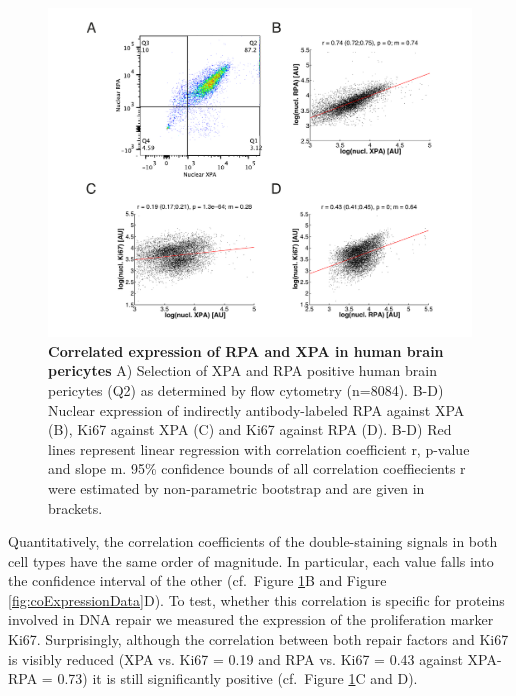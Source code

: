 \begin{figure}[htbp]
	\begin{center}
		\includegraphics[width=1\textwidth]{Abbildungen/figureTAC_3.pdf}
		\caption{\textbf{Correlated expression of RPA and XPA in human brain pericytes} A) Selection of XPA and RPA positive human brain pericytes (Q2) as determined by flow cytometry (n=8084). B-D) Nuclear expression of indirectly antibody-labeled RPA against XPA (B), Ki67 against XPA (C) and Ki67 against RPA (D). B-D) Red lines represent linear regression with correlation coefficient r, p-value and slope m. 95\% confidence bounds of all correlation coeffiecients r were estimated by non-parametric bootstrap and are given in brackets.}
		\label{fig:FC_correlation}
	\end{center}
\end{figure}

Quantitatively, the correlation coefficients of the double-staining signals in both cell types have the same order of magnitude. In particular, each value falls into the confidence interval of the other (cf.\ Figure \ref{fig:FC_correlation}B and Figure \ref{fig:coExpressionData}D). To test, whether this correlation is specific for proteins involved in DNA repair we measured the expression of the proliferation marker Ki67. Surprisingly, although the correlation between both repair factors and Ki67 is visibly reduced (XPA vs. Ki67 = 0.19 and RPA vs. Ki67 = 0.43 against XPA-RPA = 0.73) it is still significantly positive (cf.\ Figure \ref{fig:FC_correlation}C and D).

